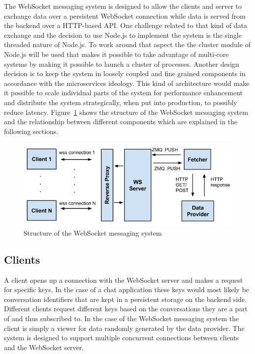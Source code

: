 The WebSocket messaging system is designed to allow the clients and server to exchange data over a persistent WebSocket connection while data is served from the backend over a HTTP-based API. One challenge related to that kind of data exchange and the decision to use Node.js to implement the system is the single threaded nature of Node.js. To work around that aspect the the cluster module of Node.js will be used that makes it possible to take advantage of multi-core systems by making it possible to launch a cluster of processes. Another design decision is to keep the system in loosely coupled and fine grained components in accordance with the microservices ideology. This kind of architecture would make it possible to scale individual parts of the system for performance enhancement and distribute the system strategically, when put into production, to possibly reduce latency. Figure~\ref{fig:webSocketMessagingSystem} shows the structure of the WebSocket messaging system and the relationship between different components which are explained in the following sections.
\\
\begin{figure}[h!]
	\centering
	\includegraphics[width=1\textwidth]{images/websocketMessagingSystem}
	\caption{Structure of the WebSocket messaging system}
	\label{fig:webSocketMessagingSystem}
\end{figure}

\subsection{Clients}

A client opens up a connection with the WebSocket server and makes a request for specific keys. In the case of a chat application these keys would most likely be conversation identifiers that are kept in a persistent storage on the backend side. Different clients request different keys based on the conversations they are a part of and thus subscribed to. In the case of the WebSocket messaging system the client is simply a viewer for data randomly generated by the data provider. The system is designed to support multiple concurrent connections between clients and the WebSocket server.

